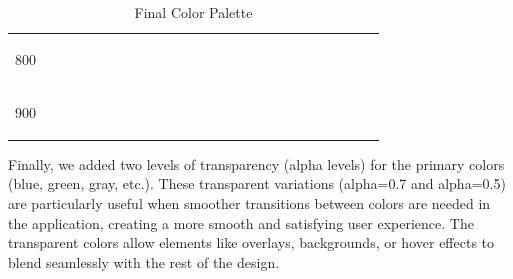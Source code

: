 \begin{table}[ht]
\begin{tabular}{|c|p{1.5cm}<{\centering}|p{1.5cm}<{\centering}|p{1.5cm}<{\centering}|p{1.5cm}<{\centering}|p{1.5cm}<{\centering}|p{1.5cm}<{\centering}|}
800 & \colorbox{blue800}{\strut \ \ \ \ \ \ } & \colorbox{green800}{\strut \ \ \ \ \ \ } & \colorbox{red800}{\strut \ \ \ \ \ \ } & \colorbox{orange800}{\strut \ \ \ \ \ \ } & \colorbox{yellow800}{\strut \ \ \ \ \ \ } & \colorbox{gray800}{\strut \ \ \ \ \ \ } \\
900 & \colorbox{blue900}{\strut \ \ \ \ \ \ } & \colorbox{green900}{\strut \ \ \ \ \ \ } & \colorbox{red900}{\strut \ \ \ \ \ \ } & \colorbox{orange900}{\strut \ \ \ \ \ \ } & \colorbox{yellow900}{\strut \ \ \ \ \ \ } & \colorbox{gray900}{\strut \ \ \ \ \ \ } \\ \hline
\end{tabular}
\endgroup
\caption{Final Color Palette}
\label{tab:final_color_palette}
\end{table}
\FloatBarrier

\noindent Finally, we added two levels of transparency (alpha levels) for the primary colors (blue, green, gray, etc.). These transparent variations (alpha=0.7 and alpha=0.5) are particularly useful when smoother transitions between colors are needed in the application, creating a more smooth and satisfying user experience. The transparent colors allow elements like overlays, backgrounds, or hover effects to blend seamlessly with the rest of the design.

